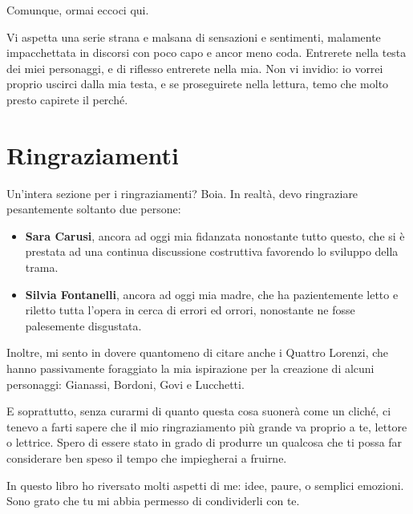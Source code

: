 \documentclass[12pt]{book}
\begin{document}
Comunque, ormai eccoci qui.

Vi aspetta una serie strana e malsana di sensazioni e sentimenti, malamente impacchettata in discorsi con poco capo e ancor meno coda. Entrerete nella testa dei miei personaggi, e di riflesso entrerete nella mia. Non vi invidio: io vorrei proprio uscirci dalla mia testa, e se proseguirete nella lettura, temo che molto presto capirete il perché.

\section{Ringraziamenti}

Un'intera sezione per i ringraziamenti? Boia. In realtà, devo ringraziare pesantemente soltanto due persone:

\begin{itemize}
	\item \textbf{Sara Carusi}, ancora ad oggi mia fidanzata nonostante tutto questo, che si è prestata ad una continua discussione costruttiva favorendo lo sviluppo della trama.
	\item \textbf{Silvia Fontanelli}, ancora ad oggi mia madre, che ha pazientemente letto e riletto tutta l'opera in cerca di errori ed orrori, nonostante ne fosse palesemente disgustata.
\end{itemize}

Inoltre, mi sento in dovere quantomeno di citare anche i Quattro Lorenzi, che hanno passivamente foraggiato la mia ispirazione per la creazione di alcuni personaggi: Gianassi, Bordoni, Govi e Lucchetti.

E soprattutto, senza curarmi di quanto questa cosa suonerà come un cliché, ci tenevo a farti sapere che il mio ringraziamento più grande va proprio a te, lettore o lettrice. Spero di essere stato in grado di produrre un qualcosa che ti possa far considerare ben speso il tempo che impiegherai a fruirne.

In questo libro ho riversato molti aspetti di me: idee, paure, o semplici emozioni. Sono grato che tu mi abbia permesso di condividerli con te.

\newpage
\tableofcontents
\newpage


































\end{document}
